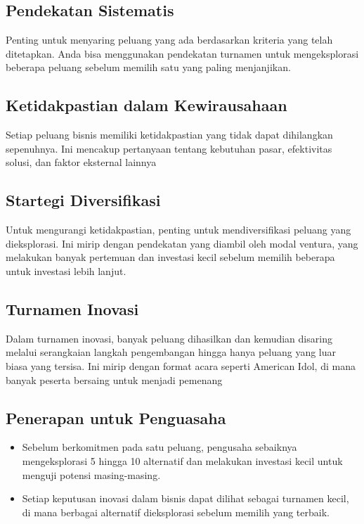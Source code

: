\documentclass{article}
\begin{document}
\subsection{Pendekatan Sistematis}
Penting untuk menyaring peluang yang ada berdasarkan kriteria yang telah ditetapkan. Anda bisa menggunakan pendekatan turnamen untuk mengeksplorasi beberapa peluang sebelum memilih satu yang paling menjanjikan.

\subsection{Ketidakpastian dalam Kewirausahaan}
Setiap peluang bisnis memiliki ketidakpastian yang tidak dapat dihilangkan sepenuhnya. Ini mencakup pertanyaan tentang kebutuhan pasar, efektivitas solusi, dan faktor eksternal lainnya

\subsection{Startegi Diversifikasi}
Untuk mengurangi ketidakpastian, penting untuk mendiversifikasi peluang yang dieksplorasi. Ini mirip dengan pendekatan yang diambil oleh modal ventura, yang melakukan banyak pertemuan dan investasi kecil sebelum memilih beberapa untuk investasi lebih lanjut.

\subsection{Turnamen Inovasi}
Dalam turnamen inovasi, banyak peluang dihasilkan dan kemudian disaring melalui serangkaian langkah pengembangan hingga hanya peluang yang luar biasa yang tersisa. Ini mirip dengan format acara seperti American Idol, di mana banyak peserta bersaing untuk menjadi pemenang

\subsection{Penerapan untuk Penguasaha}
\begin{itemize}
    \item Sebelum berkomitmen pada satu peluang, pengusaha sebaiknya mengeksplorasi 5 hingga 10 alternatif dan melakukan investasi kecil untuk menguji potensi masing-masing.
    \item Setiap keputusan inovasi dalam bisnis dapat dilihat sebagai turnamen kecil, di mana berbagai alternatif dieksplorasi sebelum memilih yang terbaik.
\end{itemize}
\end{document}
